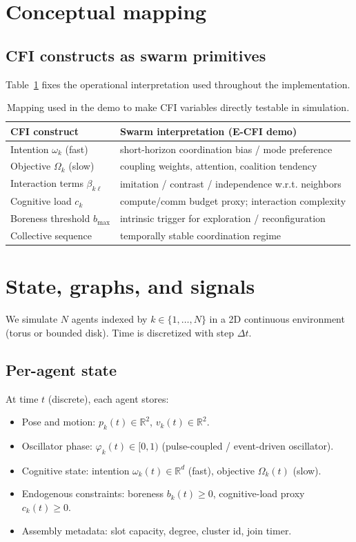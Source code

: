 \documentclass[11pt]{article}
\newcommand{\R}{\mathbb{R}}
\newcommand{\varph}{\varphi}
\begin{document}
\section{Conceptual mapping}
\subsection{CFI constructs as swarm primitives}
Table~\ref{tab:mapping} fixes the operational interpretation used throughout the implementation.

\begin{table}[h]
\centering
\begin{tabular}{@{}ll@{}}
\toprule
\textbf{CFI construct} & \textbf{Swarm interpretation (E-CFI demo)} \\
\midrule
Intention $\omega_k$ (fast) & short-horizon coordination bias / mode preference \\
Objective $\Omega_k$ (slow) & coupling weights, attention, coalition tendency \\
Interaction terms $\beta_{k\ell}$ & imitation / contrast / independence w.r.t. neighbors \\
Cognitive load $c_k$ & compute/comm budget proxy; interaction complexity \\
Boreness threshold $b_{\max}$ & intrinsic trigger for exploration / reconfiguration \\
Collective sequence & temporally stable coordination regime \\
\bottomrule
\end{tabular}
\caption{Mapping used in the demo to make CFI variables directly testable in simulation.}
\label{tab:mapping}
\end{table}

\section{State, graphs, and signals}
We simulate $N$ agents indexed by $k\in\{1,\dots,N\}$ in a 2D continuous environment (torus or bounded disk).
Time is discretized with step $\Delta t$.

\subsection{Per-agent state}
At time $t$ (discrete), each agent stores:
\begin{itemize}[leftmargin=2.2em]
\item Pose and motion: $p_k(t)\in\R^2$, $v_k(t)\in\R^2$.
\item Oscillator phase: $\varph_k(t)\in[0,1)$ (pulse-coupled / event-driven oscillator).
\item Cognitive state: intention $\omega_k(t)\in\R^d$ (fast), objective $\Omega_k(t)$ (slow).
\item Endogenous constraints: boreness $b_k(t)\ge 0$, cognitive-load proxy $c_k(t)\ge 0$.
\item Assembly metadata: slot capacity, degree, cluster id, join timer.
\end{itemize}
\end{document}
